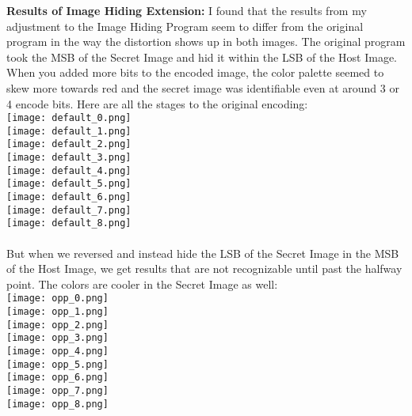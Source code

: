 \documentclass[10pt]{article}
\begin{document}
\noindent \textbf{Results of Image Hiding Extension: } I found that the results from my adjustment to the Image Hiding Program seem to differ from the original program in the way the distortion shows up in both images. The original program took the MSB of the Secret Image and hid it within the LSB of the Host Image. When you added more bits to the encoded image, the color palette seemed to skew more towards red and the secret image was identifiable even at around 3 or 4 encode bits.
Here are all the stages to the original encoding: \\
\texttt{[image: default\_0.png]}\\
\texttt{[image: default\_1.png]}\\
\texttt{[image: default\_2.png]}\\
\texttt{[image: default\_3.png]}\\
\texttt{[image: default\_4.png]}\\
\texttt{[image: default\_5.png]}\\
\texttt{[image: default\_6.png]}\\
\texttt{[image: default\_7.png]}\\
\texttt{[image: default\_8.png]}\\
\vspace{0.2in} \\
But when we reversed and instead hide the LSB of the Secret Image in the MSB of the Host Image, we get results that are not recognizable until past the halfway point. The colors are cooler in the Secret Image as well:\\
\texttt{[image: opp\_0.png]}\\
\texttt{[image: opp\_1.png]}\\
\texttt{[image: opp\_2.png]}\\
\texttt{[image: opp\_3.png]}\\
\texttt{[image: opp\_4.png]}\\
\texttt{[image: opp\_5.png]}\\
\texttt{[image: opp\_6.png]}\\
\texttt{[image: opp\_7.png]}\\
\texttt{[image: opp\_8.png]}\\



\fi
\end{document}
